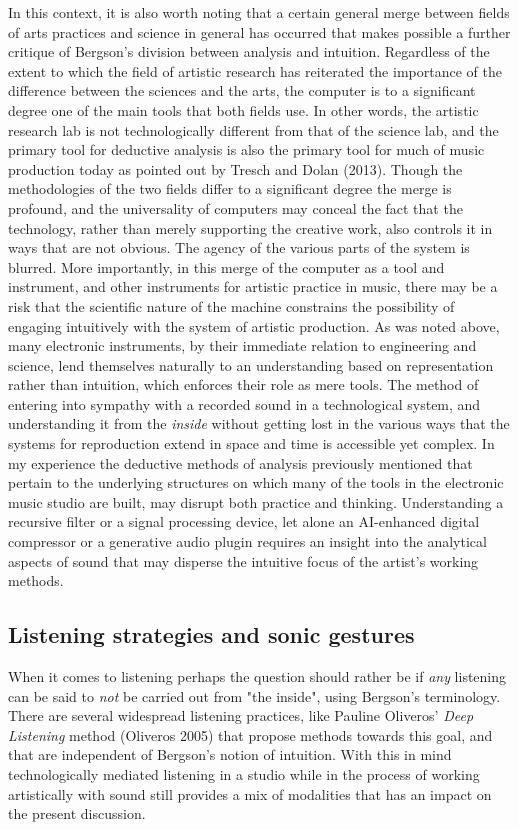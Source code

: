 \documentclass[11pt]{article}
\makeatletter
\newcommand{\cslcitation}[2]
 {\protect\hyper@linkstart{cite}{citeproc_bib_item_#1}#2\hyper@linkend}
\makeatother
\begin{document}
In this context, it is also worth noting that a certain general merge between fields of arts practices and science in general has occurred that makes possible a further critique of Bergson's division between analysis and intuition.
Regardless of the extent to which the field of artistic research has reiterated the importance of the difference between the sciences and the arts, the computer is to a significant degree one of the main tools that both fields use.
In other words, the artistic research lab is not technologically different from that of the science lab, and the primary tool for deductive analysis is also the primary tool for much of music production today as pointed out by Tresch and Dolan (\cslcitation{34}{2013}).
Though the methodologies of the two fields differ to a significant degree the merge is profound, and the universality of computers may conceal the fact that the technology, rather than merely supporting the creative work, also controls it in ways that are not obvious.
The agency of the various parts of the system is blurred.
More importantly, in this merge of the computer as a tool and instrument, and other instruments for artistic practice in music, there may be a risk that the scientific nature of the machine constrains the possibility of engaging intuitively with the system of artistic production.
As was noted above, many electronic instruments, by their immediate relation to engineering and science, lend themselves naturally to an understanding based on representation rather than intuition, which enforces their role as mere tools.
The method of entering into sympathy with a recorded sound in a technological system, and understanding it from the \emph{inside} without getting lost in the various ways that the systems for reproduction extend in space and time is accessible yet complex.
In my  experience the deductive methods of analysis previously mentioned that pertain to the underlying structures on which many of the tools in the electronic music studio are built, may disrupt both practice and thinking.
Understanding a recursive filter or a signal processing device, let alone an AI-enhanced digital compressor or a generative audio plugin requires an insight into the analytical aspects of sound that may disperse the intuitive focus of the artist's working methods.
\subsection*{Listening strategies and sonic gestures}
\label{sec:org75ce55e}
When it comes to listening perhaps the question should rather be if \emph{any} listening can be said to \emph{not} be carried out from "the inside", using Bergson's terminology.
There are several widespread listening practices, like Pauline Oliveros' \emph{Deep Listening} method (\cslcitation{26}{Oliveros 2005}) that propose methods towards this goal, and that are independent of Bergson's notion of intuition.
With this in mind technologically mediated listening in a studio while in the process of working artistically with sound still provides a mix of modalities that has an impact on the present discussion.
\end{document}
